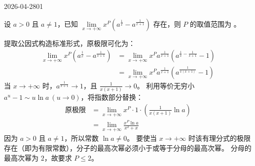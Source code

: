 \begin{mistake}{2026-04-28}{01}

\begin{problemcontent}
设 \(a>0\) 且 \(a \neq 1\)，已知 \(\lim\limits_{x \to +\infty} x^P \left( a^{\frac{1}{x}} - a^{\frac{1}{x+1}} \right)\) 存在，则 \(P\) 的取值范围为 \underline{\quad\quad}。
\end{problemcontent}

\begin{solutioncontent}
提取公因式构造标准形式，原极限可化为：
\[
\begin{aligned}
\lim_{x \to +\infty} x^P \left( a^{\frac{1}{x}} - a^{\frac{1}{x+1}} \right)
&= \lim_{x \to +\infty} x^P a^{\frac{1}{x+1}} \left( a^{\frac{1}{x} - \frac{1}{x+1}} - 1 \right) \\
&= \lim_{x \to +\infty} x^P a^{\frac{1}{x+1}} \left( a^{\frac{1}{x(x+1)}} - 1 \right)
\end{aligned}
\]
当 \(x \to +\infty\) 时，\(a^{\frac{1}{x+1}} \to 1\)，且 \(\frac{1}{x(x+1)} \to 0\)。
利用等价无穷小 \(a^u - 1 \sim u \ln a\ (u \to 0)\)，将指数部分替换：
\[
\begin{aligned}
\text{原极限} &= \lim_{x \to +\infty} x^P \cdot 1 \cdot \left( \frac{1}{x(x+1)} \ln a \right) \\
&= \lim_{x \to +\infty} \frac{x^P \ln a}{x^2+x}
\end{aligned}
\]
因为 \(a>0\) 且 \(a \neq 1\)，所以常数 \(\ln a \neq 0\)。
要使当 \(x \to +\infty\) 时该有理分式的极限存在（即为有限常数），分子的最高次幂必须小于或等于分母的最高次幂。
分母的最高次幂为 \(2\)，故要求 \(P \le 2\)。
\end{solutioncontent}


\end{mistake}
